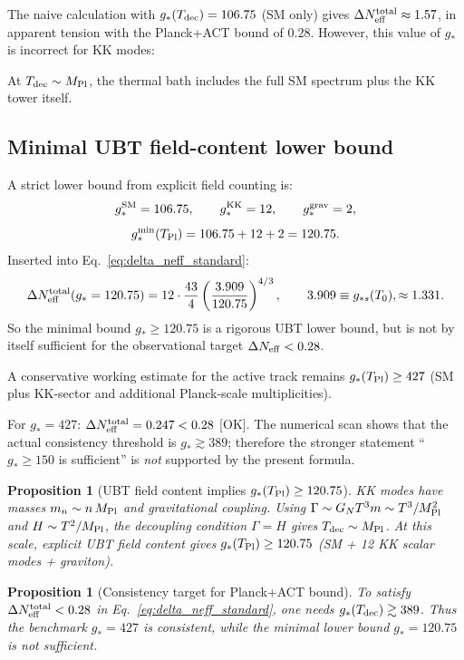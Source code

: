 \documentclass[12pt,a4paper]{article}
\newtheorem{proposition}[theorem]{Proposition}
\begin{document}
The naive calculation with $g_*(T_{\rm dec}) = 106.75$ (SM only)
gives $\Delta N_{\rm eff}^{\rm total} \approx 1.57$,
in apparent tension with the Planck+ACT bound of $0.28$.
However, this value of $g_*$ is incorrect for KK modes:

At $T_{\rm dec}\sim M_{\rm Pl}$, the thermal bath includes the
full SM spectrum plus the KK tower itself.

\subsection*{Minimal UBT field-content lower bound}

A strict lower bound from explicit field counting is:
\[
g_*^{\rm SM}=106.75,\qquad
g_*^{\rm KK}=12,\qquad
g_*^{\rm grav}=2,
\]
\[
g_*^{\rm min}(T_{\rm Pl})=106.75+12+2=120.75.
\]
Inserted into Eq.~\eqref{eq:delta_neff_standard}:
\[
\Delta N_{\rm eff}^{\rm total}(g_*=120.75)
=12\cdot\frac{43}{4}\left(\frac{3.909}{120.75}\right)^{4/3},
\qquad 3.909 \equiv g_{*s}(T_0),
\approx 1.331.
\]
So the minimal bound $g_*\ge120.75$ is a rigorous UBT lower bound,
but is not by itself sufficient for the observational target
$\Delta N_{\rm eff}<0.28$.

A conservative working estimate for the active track remains
$g_*(T_{\rm Pl})\geq 427$
(SM plus KK-sector and additional Planck-scale multiplicities).

For $g_* = 427$: $\Delta N_{\rm eff}^{\rm total} = 0.247 < 0.28$ [OK].
The numerical scan shows that the actual consistency threshold is
$g_* \gtrsim 389$; therefore the stronger statement ``$g_*\ge 150$ is sufficient''
is \emph{not} supported by the present formula.

\begin{proposition}[UBT field content implies $g_*(T_{\rm Pl})\ge 120.75$]
KK modes have masses $m_n \sim n\,M_{\rm Pl}$ and gravitational coupling.
Using $\Gamma \sim G_N T^3 m \sim T^3/M_{\rm Pl}^2$ and $H\sim T^2/M_{\rm Pl}$,
the decoupling condition $\Gamma=H$ gives $T_{\rm dec}\sim M_{\rm Pl}$.
At this scale, explicit UBT field content gives
$g_*(T_{\rm Pl})\ge 120.75$ (SM + 12 KK scalar modes + graviton).
\end{proposition}

\begin{proposition}[Consistency target for Planck+ACT bound]
To satisfy $\Delta N_{\rm eff}^{\rm total}<0.28$ in
Eq.~\eqref{eq:delta_neff_standard}, one needs
$g_*(T_{\rm dec})\gtrsim 389$.
Thus the benchmark $g_*=427$ is consistent, while the minimal lower bound
$g_*=120.75$ is not sufficient.
\end{proposition}
\end{document}
